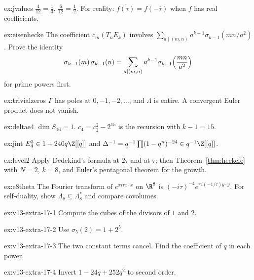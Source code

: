 \begin{hint}{ex:jvalues}
$\frac4{12}=\frac13$, $\frac6{12}=\frac12$. For reality: $\overline{f(\tau)}=f(-\overline\tau)$ when $f$ has real coefficients.
\end{hint}
\begin{hint}{ex:eisenhecke}
The coefficient $c_m(T_nE_k)$ involves $\sum_{a\mid(m,n)}a^{k-1}\sigma_{k-1}(mn/a^2)$. Prove the identity
\[
\sigma_{k-1}(m)\,\sigma_{k-1}(n)=\sum_{a\mid(m,n)}a^{k-1}\sigma_{k-1}\Bigl(\frac{mn}{a^2}\Bigr)
\]
for prime powers first.
\end{hint}
\begin{hint}{ex:trivialzeros}
$\Gamma$ has poles at $0,-1,-2,\dots$, and $\Lambda$ is entire. A convergent Euler product does not vanish.
\end{hint}
\begin{hint}{ex:deltae4}
$\dim S_{16}=1$. $c_4=c_2^2-2^{15}$ is the recursion with $k-1=15$.
\end{hint}
\begin{hint}{ex:jint}
$E_4^3\in1+240q\Z[[q]]$ and $\Delta^{-1}=q^{-1}\prod(1-q^n)^{-24}\in q^{-1}\Z[[q]]$.
\end{hint}
\begin{hint}{ex:level2}
Apply Dedekind's formula at $2\tau$ and at $\tau$; then Theorem~\ref{thm:heckefe} with $N=2$, $k=8$, and Euler's pentagonal theorem for the growth.
\end{hint}
\begin{hint}{ex:e8theta}
The Fourier transform of $e^{\pi i\tau x\cdot x}$ on $\R^8$ is $(-i\tau)^{-4}e^{\pi i(-1/\tau)y\cdot y}$. For self-duality, show $\Lambda_8\subseteq\Lambda_8^*$ and compare covolumes.
\end{hint}

\begin{hint}{ex:v13-extra-17-1}
Compute the cubes of the divisors of $1$ and $2$.
\end{hint}

\begin{hint}{ex:v13-extra-17-2}
Use $\sigma_5(2)=1+2^5$.
\end{hint}

\begin{hint}{ex:v13-extra-17-3}
The two constant terms cancel. Find the coefficient of $q$ in each power.
\end{hint}

\begin{hint}{ex:v13-extra-17-4}
Invert $1-24q+252q^2$ to second order.
\end{hint}

